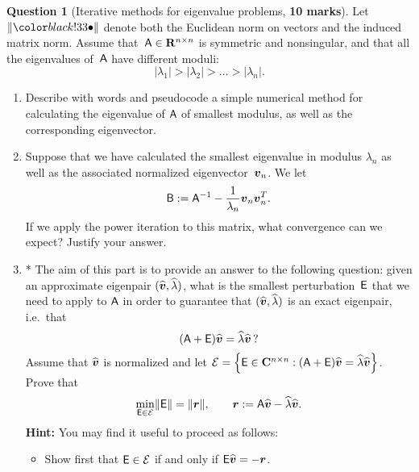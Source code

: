 \documentclass[11pt]{article}
\theoremstyle{definition}
\newtheorem{question}{Question}
\theoremstyle{remark}
\theoremstyle{plain}%
\begin{document}
\newpage
\begin{question}
    [Iterative methods for eigenvalue problems, \textbf{10 marks}]
    Let $\norm{\placeholder}$ denote both the Euclidean norm on vectors and the induced matrix norm.
    Assume that~$\mathsf A \in \mathbf R^{n \times n}$ is symmetric and nonsingular,
    and that all the eigenvalues of~$\mathsf A$ have different moduli:
    \[
        \lvert \lambda_1 \rvert
        >
        \lvert \lambda_2 \rvert
        >
        \dots
        >
        \lvert \lambda_n \rvert.
    \]

    \begin{enumerate}
        \item
            Describe with words and pseudocode a simple numerical method for calculating the eigenvalue of $\mathsf A$ of smallest modulus,
            as well as the corresponding eigenvector.

        \item
            Suppose that we have calculated the smallest eigenvalue in modulus $\lambda_n$ as well as the associated normalized eigenvector~$\mathbf{\boldsymbol{v}}_n$.
            We let
            \[
                \mathsf B := \mathsf A^{-1} - \frac{1}{\lambda_n} \mathbf{\boldsymbol{v}}_n \mathbf{\boldsymbol{v}}_n^T.
            \]
            If we apply the power iteration to this matrix,
            what convergence can we expect?
            Justify your answer.


        \item
            *
            The aim of this part is to provide an answer to the following question:
            given an approximate eigenpair $(\widehat {\mathbf{\boldsymbol{v}}}, \widehat \lambda)$,
            what is the smallest perturbation~$\mathsf E$ that we need to apply to $\mathsf A$ in order to guarantee that
            $(\widehat {\mathbf{\boldsymbol{v}}}, \widehat \lambda)$ is an exact eigenpair, i.e.\ that
            \[
                (\mathsf A + \mathsf E) \widehat {\mathbf{\boldsymbol{v}}} = \widehat \lambda \widehat {\mathbf{\boldsymbol{v}}} \,?
            \]
            Assume that $\widehat {\mathbf{\boldsymbol{v}}}$ is normalized and
            let $\mathcal E = \Bigl\{\mathsf E \in \mathbf C^{n \times n}: (\mathsf A + \mathsf E) \widehat {\mathbf{\boldsymbol{v}}} = \widehat \lambda \widehat {\mathbf{\boldsymbol{v}}} \Bigr\}$.
            Prove that
            \begin{equation}
                \label{eq:kahan_parlett_jiang}
                \min_{\mathsf E \in \mathcal E} \lVert\mathsf E\rVert = \lVert\mathbf{\boldsymbol{r}}\rVert, \qquad \mathbf{\boldsymbol{r}} := \mathsf A \widehat {\mathbf{\boldsymbol{v}}} - \widehat \lambda \widehat {\mathbf{\boldsymbol{v}}}.
            \end{equation}
            \textbf{Hint:} You may find it useful to proceed as follows:
            \begin{itemize}
                \item
                    Show first that $\mathsf E \in \mathcal E$ if and only if $\mathsf E \widehat {\mathbf{\boldsymbol{v}}} = - \mathbf{\boldsymbol{r}}$.


\end{itemize}
\end{enumerate}
\end{question}
\end{document}
